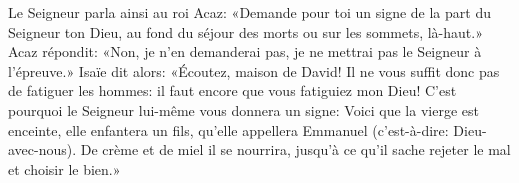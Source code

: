 Le Seigneur parla ainsi au roi Acaz:
	«Demande pour toi un signe de la part du Seigneur ton Dieu,
	au fond du séjour des morts ou sur les sommets, là-haut.»
Acaz répondit: «Non, je n’en demanderai pas,
	je ne mettrai pas le Seigneur à l’épreuve.»
Isaïe dit alors: «Écoutez, maison de David!
	Il ne vous suffit donc pas de fatiguer les hommes:
	il faut encore que vous fatiguiez mon Dieu!
	C’est pourquoi le Seigneur lui-même vous donnera un signe:
	Voici que la vierge est enceinte,
	elle enfantera un fils, qu’elle appellera Emmanuel
	(c’est-à-dire: Dieu-avec-nous).
De crème et de miel il se nourrira,
	jusqu’à ce qu’il sache rejeter le mal et choisir le bien.»
